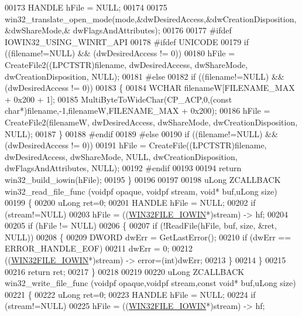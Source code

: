 \begin{DoxyCode}
00173     HANDLE hFile = NULL;
00174 
00175     win32\_translate\_open\_mode(mode,&dwDesiredAccess,&dwCreationDisposition,&dwShareMode,&
      dwFlagsAndAttributes);
00176 
00177 \textcolor{preprocessor}{#ifdef IOWIN32\_USING\_WINRT\_API}
00178 \textcolor{preprocessor}{#ifdef UNICODE}
00179     \textcolor{keywordflow}{if} ((filename!=NULL) && (dwDesiredAccess != 0))
00180         hFile = CreateFile2((LPCTSTR)filename, dwDesiredAccess, dwShareMode, dwCreationDisposition, NULL);
00181 \textcolor{preprocessor}{#else}
00182     \textcolor{keywordflow}{if} ((filename!=NULL) && (dwDesiredAccess != 0))
00183     \{
00184         WCHAR filenameW[FILENAME\_MAX + 0x200 + 1];
00185         MultiByteToWideChar(CP\_ACP,0,(\textcolor{keyword}{const} \textcolor{keywordtype}{char}*)filename,-1,filenameW,FILENAME\_MAX + 0x200);
00186         hFile = CreateFile2(filenameW, dwDesiredAccess, dwShareMode, dwCreationDisposition, NULL);
00187     \}
00188 \textcolor{preprocessor}{#endif}
00189 \textcolor{preprocessor}{#else}
00190     \textcolor{keywordflow}{if} ((filename!=NULL) && (dwDesiredAccess != 0))
00191         hFile = CreateFile((LPCTSTR)filename, dwDesiredAccess, dwShareMode, NULL, dwCreationDisposition, 
      dwFlagsAndAttributes, NULL);
00192 \textcolor{preprocessor}{#endif}
00193 
00194     \textcolor{keywordflow}{return} win32\_build\_iowin(hFile);
00195 \}
00196 
00197 
00198 uLong ZCALLBACK win32\_read\_file\_func (voidpf opaque, voidpf stream, \textcolor{keywordtype}{void}* buf,uLong size)
00199 \{
00200     uLong ret=0;
00201     HANDLE hFile = NULL;
00202     \textcolor{keywordflow}{if} (stream!=NULL)
00203         hFile = ((\hyperlink{struct_w_i_n32_f_i_l_e___i_o_w_i_n}{WIN32FILE\_IOWIN}*)stream) -> hf;
00204 
00205     \textcolor{keywordflow}{if} (hFile != NULL)
00206     \{
00207         \textcolor{keywordflow}{if} (!ReadFile(hFile, buf, size, &ret, NULL))
00208         \{
00209             DWORD dwErr = GetLastError();
00210             \textcolor{keywordflow}{if} (dwErr == ERROR\_HANDLE\_EOF)
00211                 dwErr = 0;
00212             ((\hyperlink{struct_w_i_n32_f_i_l_e___i_o_w_i_n}{WIN32FILE\_IOWIN}*)stream) -> error=(int)dwErr;
00213         \}
00214     \}
00215 
00216     \textcolor{keywordflow}{return} ret;
00217 \}
00218 
00219 
00220 uLong ZCALLBACK win32\_write\_file\_func (voidpf opaque,voidpf stream,\textcolor{keyword}{const} \textcolor{keywordtype}{void}* buf,uLong size)
00221 \{
00222     uLong ret=0;
00223     HANDLE hFile = NULL;
00224     \textcolor{keywordflow}{if} (stream!=NULL)
00225         hFile = ((\hyperlink{struct_w_i_n32_f_i_l_e___i_o_w_i_n}{WIN32FILE\_IOWIN}*)stream) -> hf;

\end{DoxyCode}
